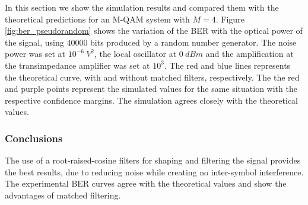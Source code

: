 \begin{refsection}

In this section we show the simulation results and compared them with the
theoretical predictions for an M-QAM system with $M=4$. Figure
\ref{fig:ber_pseudorandom} shows the variation of the BER with the optical power
of the signal, using $40000$ bits produced by a random number generator. The
noise power was set at $10^{-6}~V^2$, the local oscillator at $0~dBm$ and the
amplification at the transimpedance amplifier was set at $10^3$.
The red and blue lines represents the theoretical curve, with and without
matched filters, respectively. The the red and purple points represent the
simulated values for the same situation with the respective confidence margins.
The simulation agrees closely with the theoretical values.






\subsubsection*{Conclusions}
The use of a root-raised-cosine filters for shaping and filtering the signal
provides the best results, due to reducing noise while creating no inter-symbol
interference. The experimental BER curves agree with the theoretical values and
show the advantages of matched filtering.


\end{refsection}
